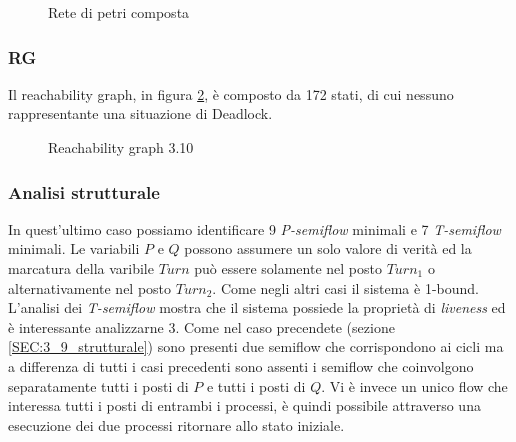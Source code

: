 \documentclass[a4paper]{article}
\begin{document}
\newpage
\begin{figure}[!ht]
\centering
{}
\caption{Rete di petri composta} \label{FIG:3.10PN}
\end{figure}
\newpage
\subsubsection{RG}
Il reachability graph, in figura \ref{FIG:3.10RG}, è composto da 172 stati, di cui nessuno rappresentante una situazione di Deadlock.
\begin{figure}[!ht]
\centering
\makebox[\textwidth][c]{
\texttt{[image: 3.10RG]}}
\caption{Reachability graph 3.10} \label{FIG:3.10RG}
\end{figure}
\newpage
\subsubsection{Analisi strutturale}
In quest'ultimo caso possiamo identificare 9 \textit{P-semiflow} minimali e 7 \textit{T-semiflow} minimali. 
Le variabili $P$ e $Q$ possono assumere un solo valore di verità ed la marcatura della varibile $Turn $ può essere solamente nel posto $Turn_1$ o alternativamente nel posto $Turn_2$. 
Come negli altri casi il sistema è 1-bound.\\
L'analisi dei \textit{T-semiflow} mostra che il sistema possiede la proprietà di \textit{liveness} ed è interessante analizzarne 3.
Come nel caso precendete (sezione \ref{SEC:3_9_strutturale}) sono presenti due semiflow che corrispondono ai cicli ma a differenza di tutti i casi precedenti sono assenti i semiflow che coinvolgono separatamente tutti i posti di $P$ e tutti i posti di $Q$.
Vi è invece un unico flow che interessa tutti i posti di entrambi i processi, è quindi possibile attraverso una esecuzione dei due processi ritornare allo stato iniziale.
\end{document}
